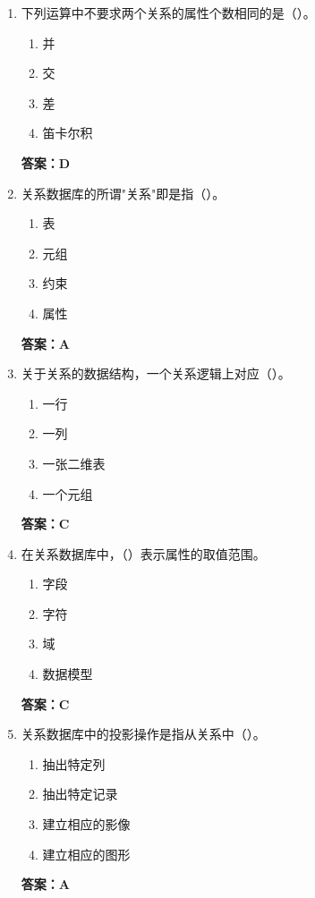 \documentclass[12pt, a4paper]{article}
\begin{document}
\begin{enumerate}[label=\arabic*.]
	\item 下列运算中不要求两个关系的属性个数相同的是（\quad）。
	      \begin{enumerate}
		      \item 并
		      \item 交
		      \item 差
		      \item 笛卡尔积
	      \end{enumerate}
	      \textbf{答案：D}

	\item 关系数据库的所谓"关系"即是指（\quad）。
	      \begin{enumerate}
		      \item 表
		      \item 元组
		      \item 约束
		      \item 属性
	      \end{enumerate}
	      \textbf{答案：A}

	\item 关于关系的数据结构，一个关系逻辑上对应（\quad）。
	      \begin{enumerate}
		      \item 一行
		      \item 一列
		      \item 一张二维表
		      \item 一个元组
	      \end{enumerate}
	      \textbf{答案：C}

	\item 在关系数据库中，（\quad）表示属性的取值范围。
	      \begin{enumerate}
		      \item 字段
		      \item 字符
		      \item 域
		      \item 数据模型
	      \end{enumerate}
	      \textbf{答案：C}

	\item 关系数据库中的投影操作是指从关系中（\quad）。
	      \begin{enumerate}
		      \item 抽出特定列
		      \item 抽出特定记录
		      \item 建立相应的影像
		      \item 建立相应的图形
	      \end{enumerate}
	      \textbf{答案：A}


\end{enumerate}
\end{document}
